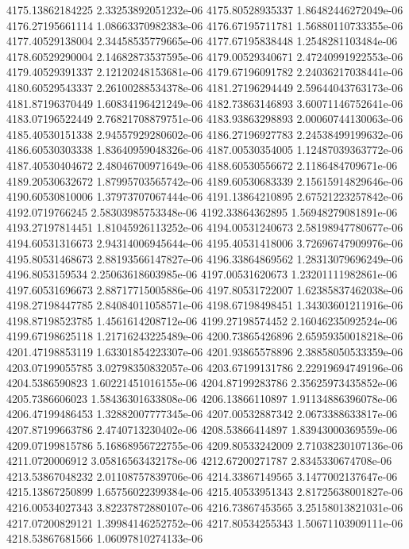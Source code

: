 {4175.13862184225 2.33253892051232e-06
4175.80528935337 1.86482446272049e-06
4176.27195661114 1.08663370982383e-06
4176.67195711781 1.56880110733355e-06
4177.40529138004 2.34458535779665e-06
4177.67195838448 1.2548281103484e-06
4178.60529290004 2.14682873537595e-06
4179.00529340671 2.47240991922553e-06
4179.40529391337 2.12120248153681e-06
4179.67196091782 2.24036217038441e-06
4180.60529543337 2.26100288534378e-06
4181.27196294449 2.59644043763173e-06
4181.87196370449 1.60834196421249e-06
4182.73863146893 3.60071146752641e-06
4183.07196522449 2.76821708879751e-06
4183.93863298893 2.00060744130063e-06
4185.40530151338 2.94557929280602e-06
4186.27196927783 2.24538499199632e-06
4186.60530303338 1.83640959048326e-06
4187.00530354005 1.12487039363772e-06
4187.40530404672 2.48046700971649e-06
4188.60530556672 2.1186484709671e-06
4189.20530632672 1.87995703565742e-06
4189.60530683339 2.15615914829646e-06
4190.60530810006 1.37973707067444e-06
4191.13864210895 2.67521223257842e-06
4192.0719766245 2.58303985753348e-06
4192.33864362895 1.56948279081891e-06
4193.27197814451 1.81045926113252e-06
4194.00531240673 2.58198947780677e-06
4194.60531316673 2.94314006945644e-06
4195.40531418006 3.72696747909976e-06
4195.80531468673 2.88193566147827e-06
4196.33864869562 1.28313079696249e-06
4196.8053159534 2.25063618603985e-06
4197.00531620673 1.23201111982861e-06
4197.60531696673 2.88717715005886e-06
4197.80531722007 1.62385837462038e-06
4198.27198447785 2.84084011058571e-06
4198.67198498451 1.34303601211916e-06
4198.87198523785 1.4561614208712e-06
4199.27198574452 2.16046235092524e-06
4199.67198625118 1.21716243225489e-06
4200.73865426896 2.65959350018218e-06
4201.47198853119 1.63301854223307e-06
4201.93865578896 2.38858050533359e-06
4203.07199055785 3.02798350832057e-06
4203.67199131786 2.22919694749196e-06
4204.5386590823 1.60221451016155e-06
4204.87199283786 2.35625973435852e-06
4205.7386606023 1.58436301633808e-06
4206.13866110897 1.91134886396078e-06
4206.47199486453 1.32882007777345e-06
4207.00532887342 2.0673388633817e-06
4207.87199663786 2.4740713230402e-06
4208.53866414897 1.83943000369559e-06
4209.07199815786 5.16868956722755e-06
4209.80533242009 2.71038230107136e-06
4211.0720006912 3.05816563432178e-06
4212.67200271787 2.8345330674708e-06
4213.53867048232 2.01108757839706e-06
4214.33867149565 3.1477002137647e-06
4215.13867250899 1.65756022399384e-06
4215.40533951343 2.81725638001827e-06
4216.00534027343 3.82237872880107e-06
4216.73867453565 3.25158013821031e-06
4217.07200829121 1.39984146252752e-06
4217.80534255343 1.50671103909111e-06
4218.53867681566 1.06097810274133e-06
}
